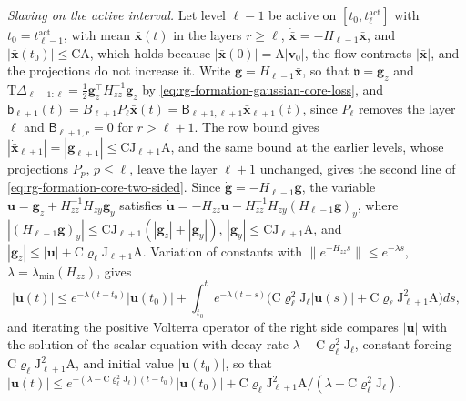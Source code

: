 \emph{Slaving on the active interval.} Let level \(\ell-1\) be active on
\([t_0,t^{\mathrm{act}}_\ell]\) with \(t_0=t^{\mathrm{act}}_{\ell-1}\), with
mean \(\bar{\mathbf x}(t)\) in the layers \(r\ge\ell\),
\(\dot{\bar{\mathbf x}}=-H_{\ell-1}\bar{\mathbf x}\), and
\(|\bar{\mathbf x}(t_0)|\le\mathrm C\mathrm A\), which holds because
\(|\bar{\mathbf x}(0)|=\mathrm A|\mathbf v_0|\), the flow contracts
\(|\bar{\mathbf x}|\), and the projections do not increase it. Write
\(\mathbf g=H_{\ell-1}\bar{\mathbf x}\), so that \(\mathfrak v=\mathbf g_z\)
and \(\mathrm T\Delta_{\ell-1:\ell}=\tfrac12\mathbf g_z^\top H_{zz}^{-1}\mathbf g_z\)
by \cref{eq:rg-formation-gaussian-core-loss}, and
\(\mathsf b_{\ell+1}(t)=B_{\ell+1}P_\ell\bar{\mathbf x}(t)=\mathsf B_{\ell+1,\ell+1}\bar{\mathbf x}_{\ell+1}(t)\),
since \(P_\ell\) removes the layer \(\ell\) and \(\mathsf B_{\ell+1,r}=0\) for
\(r>\ell+1\). The row bound gives
\(|\dot{\bar{\mathbf x}}_{\ell+1}|=|\mathbf g_{\ell+1}|\le\mathrm C\mathrm J_{\ell+1}\mathrm A\),
and the same bound at the earlier levels, whose projections \(P_p\),
\(p\le\ell\), leave the layer \(\ell+1\) unchanged, gives the second line of
\cref{eq:rg-formation-core-two-sided}. Since
\(\dot{\mathbf g}=-H_{\ell-1}\mathbf g\), the variable
\(\mathbf u=\mathbf g_z+H_{zz}^{-1}H_{zy}\mathbf g_y\) satisfies
\(\dot{\mathbf u}=-H_{zz}\mathbf u-H_{zz}^{-1}H_{zy}(H_{\ell-1}\mathbf g)_y\),
where \(|(H_{\ell-1}\mathbf g)_y|\le\mathrm C\mathrm J_{\ell+1}(|\mathbf g_z|+|\mathbf g_y|)\),
\(|\mathbf g_y|\le\mathrm C\mathrm J_{\ell+1}\mathrm A\), and
\(|\mathbf g_z|\le|\mathbf u|+\mathrm C\varrho_\ell\mathrm J_{\ell+1}\mathrm A\).
Variation of constants with \(\|e^{-H_{zz}s}\|\le e^{-\lambda s}\),
\(\lambda=\lambda_{\min}(H_{zz})\), gives
\begin{equation}
|\mathbf u(t)|\le e^{-\lambda(t-t_0)}|\mathbf u(t_0)|
+\int_{t_0}^te^{-\lambda(t-s)}\bigl(\mathrm C\varrho_\ell^2\mathrm J_\ell|\mathbf u(s)|
+\mathrm C\varrho_\ell\mathrm J_{\ell+1}^2\mathrm A\bigr)ds,
\label{eq:rg-formation-core-volterra}
\end{equation}
and iterating the positive Volterra operator of the right side compares
\(|\mathbf u|\) with the solution of the scalar equation with decay rate
\(\lambda-\mathrm C\varrho_\ell^2\mathrm J_\ell\), constant forcing
\(\mathrm C\varrho_\ell\mathrm J_{\ell+1}^2\mathrm A\), and initial value
\(|\mathbf u(t_0)|\), so that
\(|\mathbf u(t)|\le e^{-(\lambda-\mathrm C\varrho_\ell^2\mathrm J_\ell)(t-t_0)}|\mathbf u(t_0)|
+\mathrm C\varrho_\ell\mathrm J_{\ell+1}^2\mathrm A/(\lambda-\mathrm C\varrho_\ell^2\mathrm J_\ell)\).
